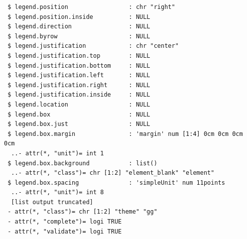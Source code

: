 \documentclass[
  letterpaper,
  DIV=11,
  numbers=noendperiod]{scrartcl}
\newenvironment{Shaded}{\begin{snugshade}}{\end{snugshade}}
\newcommand{\AttributeTok}[1]{\textcolor[rgb]{0.40,0.45,0.13}{#1}}
\newcommand{\CommentTok}[1]{\textcolor[rgb]{0.37,0.37,0.37}{#1}}
\newcommand{\FunctionTok}[1]{\textcolor[rgb]{0.28,0.35,0.67}{#1}}
\newcommand{\NormalTok}[1]{\textcolor[rgb]{0.00,0.23,0.31}{#1}}
\newcommand{\OtherTok}[1]{\textcolor[rgb]{0.00,0.23,0.31}{#1}}
\newcommand{\SpecialCharTok}[1]{\textcolor[rgb]{0.37,0.37,0.37}{#1}}
\newcommand{\StringTok}[1]{\textcolor[rgb]{0.13,0.47,0.30}{#1}}
\begin{document}
\begin{verbatim}
 $ legend.position                 : chr "right"
 $ legend.position.inside          : NULL
 $ legend.direction                : NULL
 $ legend.byrow                    : NULL
 $ legend.justification            : chr "center"
 $ legend.justification.top        : NULL
 $ legend.justification.bottom     : NULL
 $ legend.justification.left       : NULL
 $ legend.justification.right      : NULL
 $ legend.justification.inside     : NULL
 $ legend.location                 : NULL
 $ legend.box                      : NULL
 $ legend.box.just                 : NULL
 $ legend.box.margin               : 'margin' num [1:4] 0cm 0cm 0cm 0cm
  ..- attr(*, "unit")= int 1
 $ legend.box.background           : list()
  ..- attr(*, "class")= chr [1:2] "element_blank" "element"
 $ legend.box.spacing              : 'simpleUnit' num 11points
  ..- attr(*, "unit")= int 8
  [list output truncated]
 - attr(*, "class")= chr [1:2] "theme" "gg"
 - attr(*, "complete")= logi TRUE
 - attr(*, "validate")= logi TRUE
\end{verbatim}

\begin{Shaded}
\end{Shaded}
\end{document}
